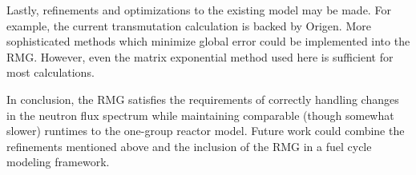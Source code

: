 Lastly, refinements and optimizations to the existing model may be made.  For example, the current 
transmutation calculation is backed by Origen.  More sophisticated methods which minimize global error 
could be implemented into the RMG.  However, even the matrix exponential method used here is 
sufficient for most calculations.

In conclusion, the RMG satisfies the requirements of correctly handling changes in the neutron flux 
spectrum while maintaining comparable (though somewhat slower) runtimes to the one-group reactor model.
Future work could combine the refinements mentioned above and the inclusion of the RMG in a fuel cycle 
modeling framework.
